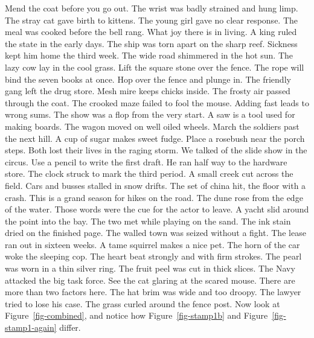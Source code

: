 \documentclass[
  letterpaper,
  DIV=11,
  numbers=noendperiod]{scrartcl}
\begin{document}
Mend the coat before you go out. The wrist was badly strained and hung
limp. The stray cat gave birth to kittens. The young girl gave no clear
response. The meal was cooked before the bell rang. What joy there is in
living. A king ruled the state in the early days. The ship was torn
apart on the sharp reef. Sickness kept him home the third week. The wide
road shimmered in the hot sun. The lazy cow lay in the cool grass. Lift
the square stone over the fence. The rope will bind the seven books at
once. Hop over the fence and plunge in. The friendly gang left the drug
store. Mesh mire keeps chicks inside. The frosty air passed through the
coat. The crooked maze failed to fool the mouse. Adding fast leads to
wrong sums. The show was a flop from the very start. A saw is a tool
used for making boards. The wagon moved on well oiled wheels. March the
soldiers past the next hill. A cup of sugar makes sweet fudge. Place a
rosebush near the porch steps. Both lost their lives in the raging
storm. We talked of the slide show in the circus. Use a pencil to write
the first draft. He ran half way to the hardware store. The clock struck
to mark the third period. A small creek cut across the field. Cars and
busses stalled in snow drifts. The set of china hit, the floor with a
crash. This is a grand season for hikes on the road. The dune rose from
the edge of the water. Those words were the cue for the actor to leave.
A yacht slid around the point into the bay. The two met while playing on
the sand. The ink stain dried on the finished page. The walled town was
seized without a fight. The lease ran out in sixteen weeks. A tame
squirrel makes a nice pet. The horn of the car woke the sleeping cop.
The heart beat strongly and with firm strokes. The pearl was worn in a
thin silver ring. The fruit peel was cut in thick slices. The Navy
attacked the big task force. See the cat glaring at the scared mouse.
There are more than two factors here. The hat brim was wide and too
droopy. The lawyer tried to lose his case. The grass curled around the
fence post. Now look at Figure~\ref{fig-combined}, and notice how
Figure~\ref{fig-stamp1b} and Figure~\ref{fig-stamp1-again} differ.
\end{document}
